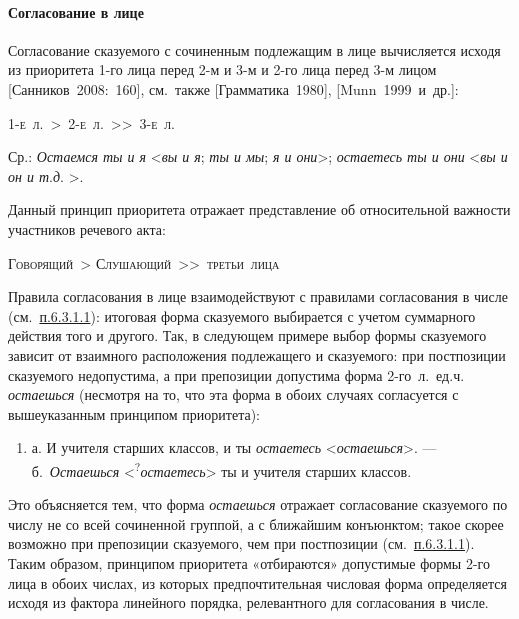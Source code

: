 \paragraph{Согласование в
лице}\label{ux441ux43eux433ux43bux430ux441ux43eux432ux430ux43dux438ux435-ux432-ux43bux438ux446ux435}

Согласование сказуемого с сочиненным подлежащим в лице вычисляется
исходя из приоритета 1-го лица перед 2-м и 3-м и 2-го лица перед 3-м
лицом {[}Санников~2008:~160{]}, см.~также {[}Грамматика~1980{]},
{[}Munn~1999~и~др.{]}:

\textsc{1-е~л.~\textgreater~2-е~л.~\textgreater\textgreater~3-е~л.}

Ср.: \textit{Остаемся ты и я} \textless{}\textit{вы и я}; \textit{ты и мы};
\textit{я и они}\textgreater; \textit{остаетесь ты и они}
\textless{}\textit{вы и он и т}.\textit{д}. \textgreater.

Данный принцип приоритета отражает представление об относительной
важности участников речевого акта:

\textsc{Говорящий~\textgreater{}
Слушающий~\textgreater\textgreater~третьи~лица}

Правила согласования в лице взаимодействуют с правилами согласования в
числе (см.~\underline{п.6.3.1.1}): итоговая форма сказуемого выбирается
с учетом суммарного действия того и другого. Так, в следующем примере
выбор формы сказуемого зависит от взаимного расположения подлежащего и
сказуемого: при постпозиции сказуемого недопустима, а при препозиции
допустима форма 2-го~л.~ед.ч. \textit{остаешься} (несмотря на то, что эта
форма в обоих случаях согласуется с вышеуказанным принципом приоритета):

\begin{enumerate}
\def\labelenumi{(\arabic{enumi})}
\setcounter{enumi}{122}
\item
  а. И учителя старших классов, и ты \textit{остаетесь}
  \textless*\textit{остаешься}\textgreater. --- б.~\textit{Остаешься}
  \textless{}\textsuperscript{?}\textit{остаетесь}\textgreater{} ты и
  учителя старших классов.
\end{enumerate}

Это объясняется тем, что форма \textit{остаешься} отражает согласование
сказуемого по числу не со всей сочиненной группой, а с ближайшим
конъюнктом; такое скорее возможно при препозиции сказуемого, чем при
постпозиции (см.~\underline{п.6.3.1.1}). Таким образом, принципом
приоритета «отбираются» допустимые формы 2-го лица в обоих числах, из
которых предпочтительная числовая форма определяется исходя из фактора
линейного порядка, релевантного для согласования в числе.

